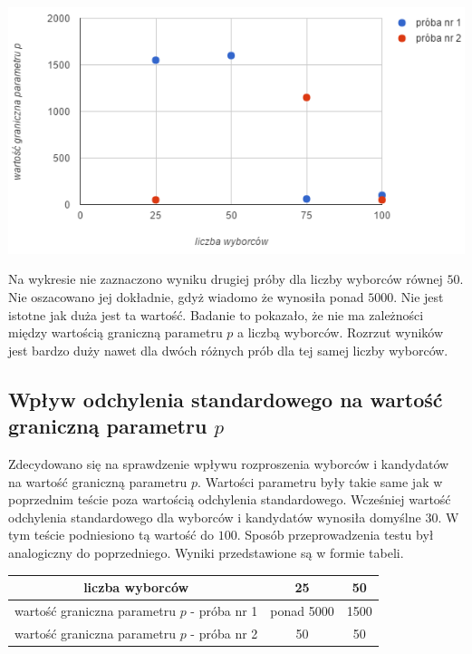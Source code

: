\documentclass[pdflatex,11pt]{../aghdoc_version2}
\begin{document}
\vspace{\baselineskip}

\begin{center}
\centerline{\includegraphics[scale=1]{pics/wartosc_graniczna_od_liczba_wyborcow.png}}
\end{center}

Na wykresie nie zaznaczono wyniku drugiej próby dla liczby wyborców równej $50$. Nie oszacowano jej dokładnie, gdyż wiadomo że wynosiła ponad $5000$. Nie jest istotne jak duża jest ta wartość. Badanie to pokazało, że nie ma zależności między wartością graniczną parametru $p$ a liczbą wyborców. Rozrzut wyników jest bardzo duży nawet dla dwóch różnych prób dla tej samej liczby wyborców.

\subsection{Wpływ odchylenia standardowego na wartość graniczną parametru $p$}
Zdecydowano się na sprawdzenie wpływu rozproszenia wyborców i kandydatów na wartość graniczną parametru $p$. Wartości parametru były takie same jak w poprzednim teście poza wartością odchylenia standardowego. Wcześniej wartość odchylenia standardowego dla wyborców i kandydatów wynosiła domyślne $30$. W tym teście podniesiono tą wartość do $100$. Sposób przeprowadzenia testu był analogiczny do poprzedniego. Wyniki przedstawione są w formie tabeli.

\begin{center}
\begin{tabular}{|c|c|c|}
   \hline
   liczba wyborców & 25 & 50 \\
   \hline
   wartość graniczna parametru $p$ - próba nr 1 & ponad 5000 & 1500 \\
   \hline
   wartość graniczna parametru $p$ - próba nr 2 & 50 & 50 \\
   \hline
\end{tabular}
\end{center}
\end{document}
